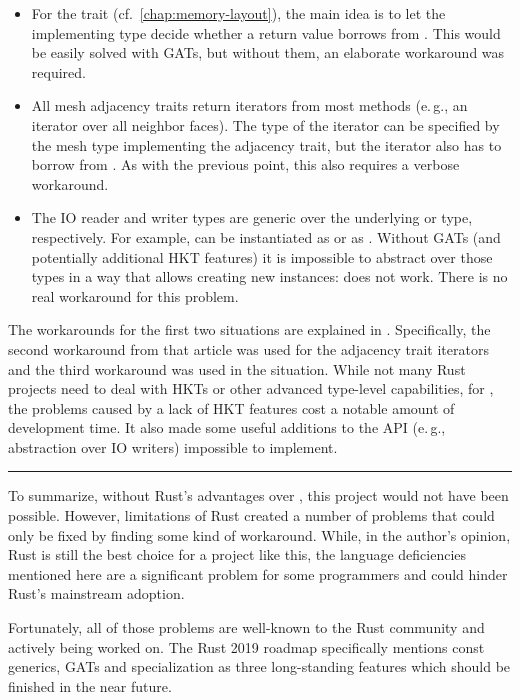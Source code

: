 \begin{itemize}
  \item For the  trait (cf.\ \autoref{chap:memory-layout}), the main idea is to let the implementing type decide whether a return value borrows from .
  This would be easily solved with GATs, but without them, an elaborate workaround was required.
  \item All mesh adjacency traits return iterators from most methods (e.\,g., an iterator over all neighbor faces).
  The type of the iterator can be specified by the mesh type implementing the adjacency trait, but the iterator also has to borrow from .
  As with the previous point, this also requires a verbose workaround.
  \item The IO reader and writer types are generic over the underlying  or  type, respectively.
  For example,  can be instantiated as  or as .
  Without GATs (and potentially additional HKT features) it is impossible to abstract over those types in a way that allows creating new instances:  does not work.
  There is no real workaround for this problem.
\end{itemize}

The workarounds for the first two situations are explained in \cite{gatworkaround}.
Specifically, the second workaround from that article was used for the adjacency trait iterators and the third workaround was used in the  situation.
While not many Rust projects need to deal with HKTs or other advanced type-level capabilities, for , the problems caused by a lack of HKT features cost a notable amount of development time.
It also made some useful additions to the API (e.\,g., abstraction over IO writers) impossible to implement.

\vfill

\begin{center}
\rule{.8\textwidth}{.15mm}
\end{center}

To summarize, without Rust's advantages over \cpp, this project would not have been possible.
However, limitations of Rust created a number of problems that could only be fixed by finding some kind of workaround.
While, in the author's opinion, Rust is still the best choice for a project like this, the language deficiencies mentioned here are a significant problem for some programmers and could hinder Rust's mainstream adoption.

Fortunately, all of those problems are well-known to the Rust community and actively being worked on.
The Rust 2019 roadmap \cite{rfc2657} specifically mentions const generics, GATs and specialization as three long-standing features which should be finished in the near future.

\vspace{1cm}
